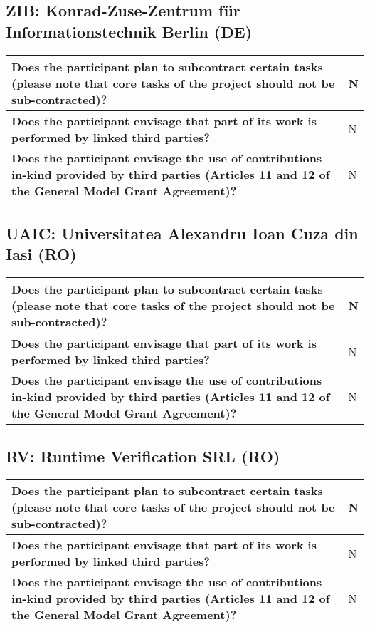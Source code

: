 \subsection*{ZIB: Konrad-Zuse-Zentrum für Informationstechnik Berlin (DE)}

\begin{longtable*}{|p{0.75\textwidth}|p{0.2\textwidth}|}
\hline
{\bf Does the participant plan to subcontract certain tasks (please
  note that core tasks of the project should not be sub-contracted)?}
&
N
\\
\hline
{\bf Does the participant envisage that  part of its work is performed
  by linked third parties?}
&
N
\\
\hline
{\bf Does the participant envisage the use of contributions in-kind
provided by third parties (Articles 11 and 12 of the General Model
Grant Agreement)?}
&
N
\\
\hline
\end{longtable*}


\subsection*{UAIC: Universitatea Alexandru Ioan Cuza din Iasi (RO)}

\begin{longtable*}{|p{0.75\textwidth}|p{0.2\textwidth}|}
\hline
{\bf Does the participant plan to subcontract certain tasks (please
  note that core tasks of the project should not be sub-contracted)?}
&
N
\\
\hline
{\bf Does the participant envisage that  part of its work is performed
  by linked third parties?}
&
N
\\
\hline
{\bf Does the participant envisage the use of contributions in-kind
provided by third parties (Articles 11 and 12 of the General Model
Grant Agreement)?}
&
N
\\
\hline
\end{longtable*}


\subsection*{RV: Runtime Verification SRL (RO)}

\begin{longtable*}{|p{0.75\textwidth}|p{0.2\textwidth}|}
\hline
{\bf Does the participant plan to subcontract certain tasks (please
  note that core tasks of the project should not be sub-contracted)?}
&
N
\\
\hline
{\bf Does the participant envisage that  part of its work is performed
  by linked third parties?}
&
N
\\
\hline
{\bf Does the participant envisage the use of contributions in-kind
provided by third parties (Articles 11 and 12 of the General Model
Grant Agreement)?}
&
N
\\
\hline
\end{longtable*}










